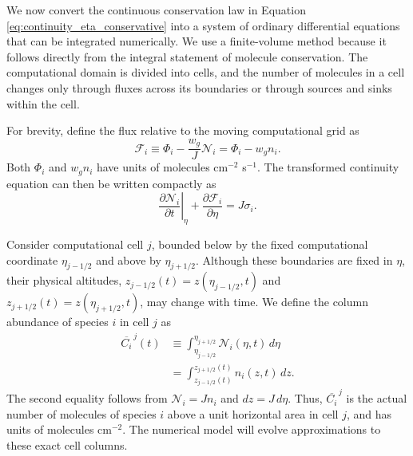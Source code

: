 \documentclass[twocolumn]{aastex631}
\begin{document}
We now convert the continuous conservation law in Equation
\eqref{eq:continuity_eta_conservative} into a system of ordinary differential
equations that can be integrated numerically. We use a finite-volume method
because it follows directly from the integral statement of molecule
conservation. The computational domain is divided into cells, and the number
of molecules in a cell changes only through fluxes across its boundaries or
through sources and sinks within the cell.

For brevity, define the flux relative to the moving computational grid as
\begin{equation}
  \mathcal{F}_i
  \equiv
  \Phi_i-\frac{w_g}{J}\mathcal{N}_i
  = \Phi_i-w_g n_i .
  \label{eq:relative_flux}
\end{equation}
Both $\Phi_i$ and $w_g n_i$ have units of molecules cm$^{-2}$ s$^{-1}$.
The transformed continuity equation can then be written compactly as
\begin{equation}
  \left.\frac{\partial\mathcal{N}_i}{\partial t}\right|_\eta
  + \frac{\partial\mathcal{F}_i}{\partial\eta}
  = J\sigma_i .
  \label{eq:continuity_eta_compact}
\end{equation}

Consider computational cell $j$, bounded below by the fixed computational
coordinate $\eta_{j-1/2}$ and above by $\eta_{j+1/2}$. Although these
boundaries are fixed in $\eta$, their physical altitudes,
$z_{j-1/2}(t)=z(\eta_{j-1/2},t)$ and
$z_{j+1/2}(t)=z(\eta_{j+1/2},t)$, may change with time. We define the column
abundance of species $i$ in cell $j$ as
\begin{align}
  \overline{C_i}^{\,j}(t)
  &\equiv
  \int_{\eta_{j-1/2}}^{\eta_{j+1/2}}
  \mathcal{N}_i(\eta,t)\,d\eta \\
  &=
  \int_{z_{j-1/2}(t)}^{z_{j+1/2}(t)}
  n_i(z,t)\,dz .
  \label{eq:cell_column}
\end{align}
The second equality follows from $\mathcal{N}_i=Jn_i$ and
$dz=J\,d\eta$. Thus, $\overline{C_i}^{\,j}$ is the actual number of molecules of species
$i$ above a unit horizontal area in cell $j$, and has units of molecules
cm$^{-2}$. The numerical model will evolve approximations to these exact cell
columns.
\end{document}
